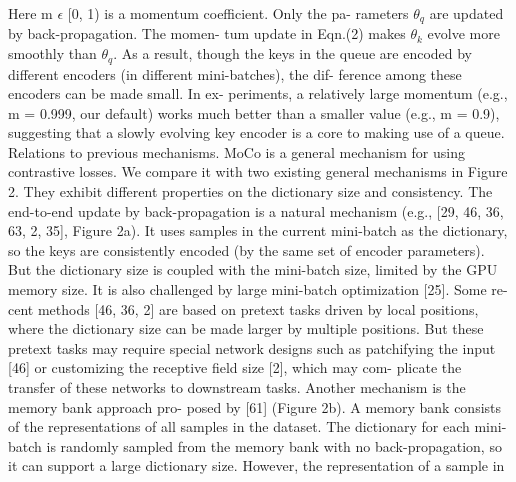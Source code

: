 \documentclass[10pt,twocolumn]{article}  %
\begin{document}
Here m $\epsilon$ [0, 1) is a momentum coefficient. Only the pa-
rameters $\theta_q$ are updated by back-propagation. The momen-
tum update in Eqn.(2) makes $\theta_k$ evolve more smoothly than
$\theta_q$. As a result, though the keys in the queue are encoded
by different encoders (in different mini-batches), the dif-
ference among these encoders can be made small. In ex-
periments, a relatively large momentum (e.g., m = 0.999,
our default) works much better than a smaller value (e.g.,
m = 0.9), suggesting that a slowly evolving key encoder is
a core to making use of a queue.
Relations to previous mechanisms. MoCo is a general
mechanism for using contrastive losses. We compare it with
two existing general mechanisms in Figure 2. They exhibit
different properties on the dictionary size and consistency.
The end-to-end update by back-propagation is a natural
mechanism (e.g., [29, 46, 36, 63, 2, 35], Figure 2a). It uses
samples in the current mini-batch as the dictionary, so the
keys are consistently encoded (by the same set of encoder
parameters). But the dictionary size is coupled with the
mini-batch size, limited by the GPU memory size. It is also
challenged by large mini-batch optimization [25]. Some re-
cent methods [46, 36, 2] are based on pretext tasks driven by
local positions, where the dictionary size can be made larger
by multiple positions. But these pretext tasks may require
special network designs such as patchifying the input [46]
or customizing the receptive field size [2], which may com-
plicate the transfer of these networks to downstream tasks.
Another mechanism is the memory bank approach pro-
posed by [61] (Figure 2b). A memory bank consists of the
representations of all samples in the dataset. The dictionary
for each mini-batch is randomly sampled from the memory
bank with no back-propagation, so it can support a large
dictionary size. However, the representation of a sample in
\end{document}
